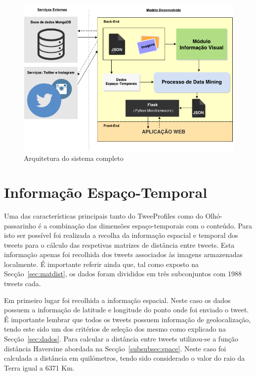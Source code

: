 \begin{figure}[h]
\centering
\includegraphics[width=1.0\linewidth]{./figures/arquitetura_sistema}
\caption{Arquitetura do sistema completo}
\label{fig:archsys}
\end{figure}


\section{Informação Espaço-Temporal} \label{sec:infoesptmp}

Uma das características principais tanto do TweeProfiles como do Olhó-passarinho é a combinação das dimensões espaço-temporais com o conteúdo. Para isto ser possível foi realizada a recolha da informação espacial e temporal dos tweets para o cálculo das respetivas matrizes de distância entre tweets. Esta informação apenas foi recolhida dos tweets associados às imagens armazenadas localmente. É importante referir ainda que, tal como exposto na Secção~\ref{sec:matdist}, os dados foram divididos em três subconjuntos com 1988 tweets cada.

Em primeiro lugar foi recolhida a informação espacial. Neste caso os dados possuem a informação de latitude e longitude do ponto onde foi enviado o tweet. É importante lembrar que todos os tweets possuem informação de geolocalização, tendo este sido um dos critérios de seleção dos mesmo como explicado na Secção~\ref{sec:dados}. Para calcular a distância entre tweets utilizou-se a função distância Haversine abordada na Secção~\ref{subsubsec:space}. Neste caso foi calculada a distância em quilómetros, tendo sido considerado o valor do raio da Terra igual a 6371 Km.

